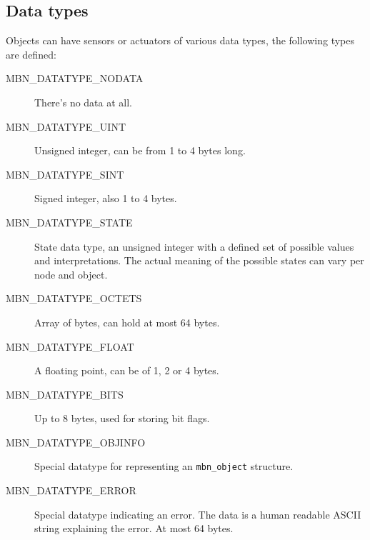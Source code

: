 \documentclass[a4paper]{report}
\begin{document}
\subsection{Data types}
Objects can have sensors or actuators of various data types, the following types are defined:
\begin{description}
 \item[MBN\_DATATYPE\_NODATA]
  There's no data at all.
 \item[MBN\_DATATYPE\_UINT]
  Unsigned integer, can be from 1 to 4 bytes long.
 \item[MBN\_DATATYPE\_SINT]
  Signed integer, also 1 to 4 bytes.
 \item[MBN\_DATATYPE\_STATE]
  State data type, an unsigned integer with a defined set of possible values and interpretations. The actual meaning of the possible states can vary per node and object.
 \item[MBN\_DATATYPE\_OCTETS]
  Array of bytes, can hold at most 64 bytes.
 \item[MBN\_DATATYPE\_FLOAT]
  A floating point, can be of 1, 2 or 4 bytes.
 \item[MBN\_DATATYPE\_BITS]
  Up to 8 bytes, used for storing bit flags.
 \item[MBN\_DATATYPE\_OBJINFO]
  Special datatype for representing an \verb|mbn_object| structure.
 \item[MBN\_DATATYPE\_ERROR]
  Special datatype indicating an error. The data is a human readable ASCII string explaining the error. At most 64 bytes.
\end{description}
\end{document}
